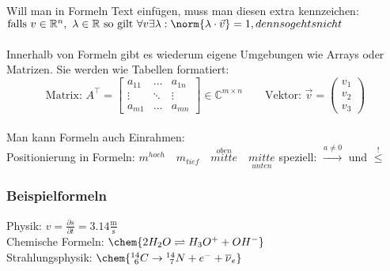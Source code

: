 	Will man in Formeln Text einfügen, muss man diesen extra kennzeichen:\\
	$\text{falls } v \in \mathbb R^n,\ \lambda \in \mathbb R \text{ so gilt } \forall v \exists \lambda: \norm{ \lambda \cdot \vec v } = 1, denn so gehts nicht$\\
	\\
	Innerhalb von Formeln gibt es wiederum eigene Umgebungen wie Arrays oder Matrizen. Sie werden wie Tabellen formatiert:
	\begin{equation}
		\text{Matrix: } A^\top = \begin{bmatrix} a_{11} & \hdots & a_{1n} \\ \vdots & \ddots & \vdots \\ a_{m1} & \hdots & a_{mn} \end{bmatrix} \in \mathbb C^{m \times n} \qquad 
		\text{Vektor: } \vec v = \begin{pmatrix} v_1 \\ v_2 \\ v_3 \end{pmatrix}
	\end{equation}
	\\
	Man kann Formeln auch Einrahmen:  \\
	Positionierung in Formeln: $m^{hoch} \quad m_{tief} \quad \overset{oben}{mitte} \quad \underset{unten}{mitte}$ \qquad speziell: $\xrightarrow{a \ne 0}$ und $\stackrel{!}\le$\\
		\subsubsection{Beispielformeln}
		Physik: $v = \frac{\partial s}{\partial t} = 3.14 \mathrm{\frac{m}{ s}}$\\	
		Chemische Formeln: $\chem{2H_2O \rightleftharpoons H_3 O^{+} + OH^-}$\\
		Strahlungsphysik: $\chem{ ^{14}_{\ 6} C \rightarrow {}^{14}_{\ 7} N + e^- + \overline \nu_e}$


